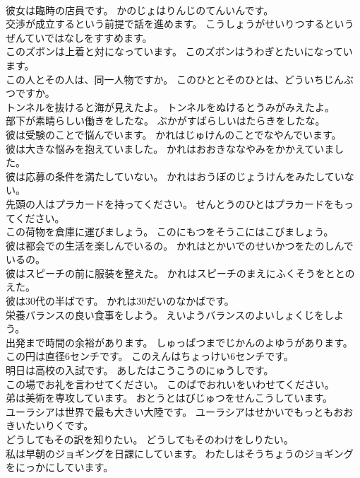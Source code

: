 \documentclass[8pt]{extreport}
\begin{document}
\begin{CJK}{UTF8}{min}
\\	彼女は臨時の店員です。	かのじょはりんじのてんいんです。 
\\	交渉が成立するという前提で話を進めます。	こうしょうがせいりつするというぜんていではなしをすすめます。 
\\	このズボンは上着と対になっています。	このズボンはうわぎとたいになっています。 
\\	この人とその人は、同一人物ですか。	このひととそのひとは、どういちじんぶつですか。 
\\	トンネルを抜けると海が見えたよ。	トンネルをぬけるとうみがみえたよ。 
\\	部下が素晴らしい働きをしたな。	ぶかがすばらしいはたらきをしたな。 
\\	彼は受験のことで悩んでいます。	かれはじゅけんのことでなやんでいます。 
\\	彼は大きな悩みを抱えていました。	かれはおおきななやみをかかえていました。 
\\	彼は応募の条件を満たしていない。	かれはおうぼのじょうけんをみたしていない。 
\\	先頭の人はプラカードを持ってください。	せんとうのひとはプラカードをもってください。 
\\	この荷物を倉庫に運びましょう。	このにもつをそうこにはこびましょう。 
\\	彼は都会での生活を楽しんでいるの。	かれはとかいでのせいかつをたのしんでいるの。 
\\	彼はスピーチの前に服装を整えた。	かれはスピーチのまえにふくそうをととのえた。 
\\	彼は30代の半ばです。	かれは30だいのなかばです。 
\\	栄養バランスの良い食事をしよう。	えいようバランスのよいしょくじをしよう。 
\\	出発まで時間の余裕があります。	しゅっぱつまでじかんのよゆうがあります。 
\\	この円は直径6センチです。	このえんはちょっけい6センチです。 
\\	明日は高校の入試です。	あしたはこうこうのにゅうしです。 
\\	この場でお礼を言わせてください。	このばでおれいをいわせてください。 
\\	弟は美術を専攻しています。	おとうとはびじゅつをせんこうしています。 
\\	ユーラシアは世界で最も大きい大陸です。	ユーラシアはせかいでもっともおおきいたいりくです。 
\\	どうしてもその訳を知りたい。	どうしてもそのわけをしりたい。 
\\	私は早朝のジョギングを日課にしています。	わたしはそうちょうのジョギングをにっかにしています。 

\end{CJK}
\end{document}
